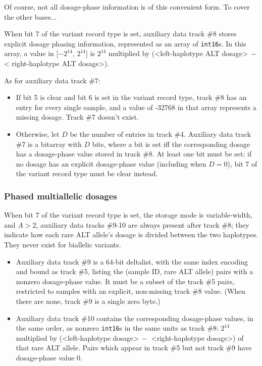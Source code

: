 \documentclass[8pt]{article}
\begin{document}
Of course, not all dosage-phase information is of this convenient form.  To
cover the other bases...

When bit 7 of the variant record type is set, auxiliary data track \#8 stores
explicit dosage phasing information, represented as an array of
\texttt{int16}s.  In this array, a value in [$-2^{14}$, $2^{14}$] is $2^{14}$
multiplied by (\textless left-haplotype ALT dosage\textgreater $\>-$ \textless
right-haplotype ALT dosage\textgreater ).

As for auxiliary data track \#7:

\begin{itemize}
\item If bit 5 is clear and bit 6 is set in the variant record type, track \#8
  has an entry for every single sample, and a value of -32768 in that array
  represents a missing dosage.  Track \#7 doesn't exist.
\item Otherwise, let $D$ be the number of entries in track \#4.  Auxiliary data
  track \#7 is a bitarray with $D$ bits, where a bit is set iff the
  corresponding dosage has a dosage-phase value stored in track \#8.  At least
  one bit must be set; if no dosage has an explicit dosage-phase value
  (including when $D=0$), bit 7 of the variant record type must be clear
  instead.
\end{itemize}

\subsubsection{Phased multiallelic dosages}

When bit 7 of the variant record type is set, the storage mode is
variable-width, and $A>2$, auxiliary data tracks \#9-10 are always present after
track \#8; they indicate how each rare ALT allele's dosage is divided between
the two haplotypes.  They never exist for biallelic variants.

\begin{itemize}
\item Auxiliary data track \#9 is a 64-bit deltalist, with the same index
  encoding and bound as track \#5, listing the (sample ID, rare ALT allele)
  pairs with a nonzero dosage-phase value.  It must be a subset of the track
  \#5 pairs, restricted to samples with an explicit, non-missing track \#8
  value.  (When there are none, track \#9 is a single zero byte.)
\item Auxiliary data track \#10 contains the corresponding dosage-phase values,
  in the same order, as nonzero \texttt{int16}s in the same units as track \#8:
  $2^{14}$ multiplied by (\textless left-haplotype dosage\textgreater $\>-$
  \textless right-haplotype dosage\textgreater ) of that rare ALT allele.
  Pairs which appear in track \#5 but not track \#9 have dosage-phase value 0.
\end{itemize}
\end{document}
